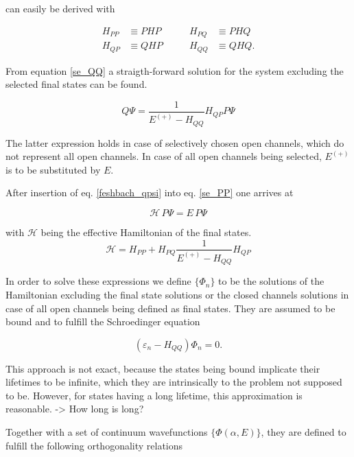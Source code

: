 can easily be derived with

\begin{align*}
  H_{PP} & \equiv PHP & \quad\quad H_{PQ} & \equiv PHQ\\
  H_{QP} & \equiv QHP & \quad\quad H_{QQ} & \equiv QHQ .
\end{align*}

From equation \ref{se_QQ} a straigth-forward solution for the system excluding
the selected final states can be found.

\begin{equation}
  Q \Psi = \frac{1}{E^{(+)}-H_{QQ}} H_{QP} P \Psi \label{feshbach_qpsi}
\end{equation}

The latter expression holds in case of selectively chosen open channels, which
do not represent all open channels. In case of all open channels being selected,
$E^{(+)}$ is to be substituted by $E$.

After insertion of eq. \ref{feshbach_qpsi} into eq. \ref{se_PP} one arrives at

\begin{equation}
  \mathscr{H} \,P \Psi = E \,P \Psi \label{se_ppsi}
\end{equation}

with $\mathscr{H}$ being the effective Hamiltonian of the final states.
\begin{equation}
  \mathscr{H} = H_{PP} + H_{PQ} \frac{1}{E^{(+)}-H_{QQ}} H_{QP}
\end{equation}

In order to solve these expressions we define $\{\Phi_n\}$ to be the solutions
of the Hamiltonian excluding the final state solutions or the closed channels
solutions in case of all open channels being defined as final states.
They are assumed to be bound and to fulfill the
Schroedinger equation

\begin{equation}
  (\varepsilon_n - H_{QQ}) \Phi_n = 0 .
\end{equation}

This approach is not exact, because the states being bound implicate
their lifetimes to be infinite, which they are intrinsically
to the problem not supposed to be. However, for states having a long lifetime,
this approximation is reasonable. -> How long is long?

Together with a set of continuum wavefunctions $\{\Phi(\alpha,E)\}$, they are
defined to fulfill the following orthogonality relations

